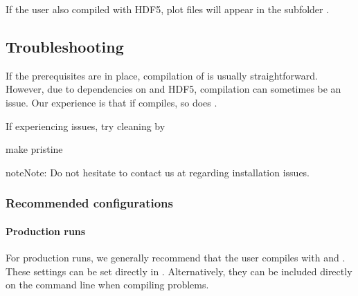 \documentclass[letterpaper,10pt,english]{sphinxmanual}
\begin{document}
\sphinxAtStartPar
If the user also compiled with HDF5, plot files will appear in the subfolder .


\subsection{Troubleshooting}
\label{\detokenize{Base/Installation:troubleshooting}}\label{\detokenize{Base/Installation:chap-troubleshooting}}
\sphinxAtStartPar
If the prerequisites are in place, compilation of  is usually straightforward.
However, due to dependencies on  and HDF5, compilation can sometimes be an issue.
Our experience is that if  compiles, so does .

\sphinxAtStartPar
If experiencing issues, try cleaning  by

\begin{sphinxVerbatim}[commandchars=\\\{\},formatcom=\scriptsize]
 
make pristine
\end{sphinxVerbatim}

\begin{sphinxadmonition}{note}{Note:}
\sphinxAtStartPar
Do not hesitate to contact us at  regarding installation issues.
\end{sphinxadmonition}


\subsubsection{Recommended configurations}
\label{\detokenize{Base/Installation:recommended-configurations}}

\paragraph{Production runs}
\label{\detokenize{Base/Installation:production-runs}}
\sphinxAtStartPar
For production runs, we generally recommend that the user compiles with  and .
These settings can be set directly in .
Alternatively, they can be included directly on the command line when compiling problems.
\end{document}
